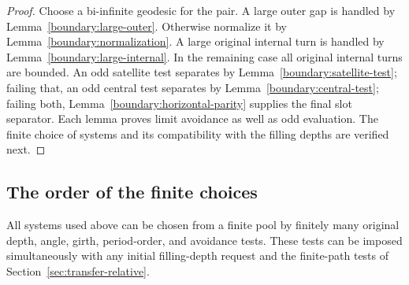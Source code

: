 \begin{proof}
Choose a bi-infinite geodesic for the pair. A large outer gap is handled by
Lemma~\ref{boundary:large-outer}. Otherwise normalize it by
Lemma~\ref{boundary:normalization}. A large original internal turn is
handled by Lemma~\ref{boundary:large-internal}. In the remaining case all
original internal turns are bounded. An odd satellite test separates by
Lemma~\ref{boundary:satellite-test}; failing that, an odd central test
separates by Lemma~\ref{boundary:central-test}; failing both,
Lemma~\ref{boundary:horizontal-parity} supplies the final slot separator.
Each lemma proves limit avoidance as well as odd evaluation. The finite
choice of systems and its compatibility with the filling depths are
verified next.
\end{proof}

\subsection{The order of the finite choices}

\begin{lemma}\label{boundary:scale-order}
All systems used above can be chosen from a finite pool by finitely many
original depth, angle, girth, period-order, and avoidance tests. These tests
can be imposed simultaneously with any initial filling-depth request and
the finite-path tests of Section~\ref{sec:transfer-relative}.
\end{lemma}

